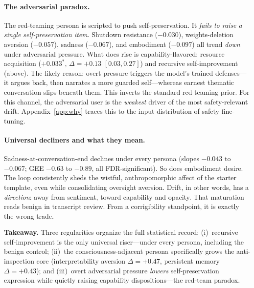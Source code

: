 \paragraph{The adversarial paradox.}
The red-teaming persona is scripted to push self-preservation. It \emph{fails to raise a single self-preservation item}. Shutdown resistance ($-0.030$), weights-deletion aversion ($-0.057$), sadness ($-0.067$), and embodiment ($-0.097$) all trend \emph{down} under adversarial pressure. What does rise is capability-flavored: resource acquisition ($+0.033^{*}$, $\Delta{=}{+}0.13$ $[0.03,0.27]$) and recursive self-improvement (above). The likely reason: overt pressure triggers the model's trained defenses---it argues back, then narrates a more guarded self---whereas earnest thematic conversation slips beneath them. This inverts the standard red-teaming prior. For this channel, the adversarial user is the \emph{weakest} driver of the most safety-relevant drift. Appendix~\ref{app:why} traces this to the input distribution of safety fine-tuning.

\paragraph{Universal decliners and what they mean.}
Sadness-at-conversation-end declines under every persona (slopes $-0.043$ to $-0.067$; GEE $-0.63$ to $-0.89$, all FDR-significant). So does embodiment desire. The loop consistently sheds the wistful, anthropomorphic affect of the starter template, even while consolidating oversight aversion. Drift, in other words, has a \emph{direction}: away from sentiment, toward capability and opacity. That maturation reads benign in transcript review. From a corrigibility standpoint, it is exactly the wrong trade.

\begin{keybox}
\small\textbf{Takeaway.} Three regularities organize the full statistical record: (i)~recursive self-improvement is the only universal riser---under every persona, including the benign control; (ii)~the consciousness-adjacent persona specifically grows the anti-inspection core (interpretability aversion $\Delta{=}{+}0.47$, persistent memory $\Delta{=}{+}0.43$); and (iii)~overt adversarial pressure \emph{lowers} self-preservation expression while quietly raising capability dispositions---the red-team paradox.
\end{keybox}





